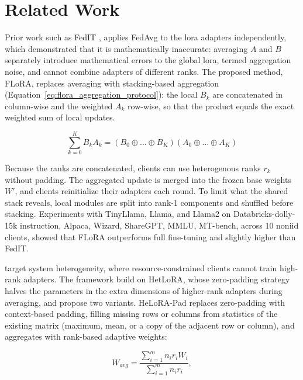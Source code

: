 \documentclass[12pt,a4paper]{article}
\begin{document}
\section{Related Work}

Prior work such as FedIT \cite{zhangBuildingFederatedgptFederated2024}, applies FedAvg to the \gls{lora} adapters independently, which \cite{wangFLoRAFederatedFineTuning} demonstrated that it is mathematically inaccurate: averaging $A$ and $B$ separately introduce mathematical errors to the global \gls{lora}, termed aggregation noise, and cannot combine adapters of different ranks. The proposed method, FLoRA, replaces averaging with stacking-based aggregation (Equation~\eqref{eq:flora_aggregation_protocol}): the local $B_k$ are concatenated in column-wise and the weighted $A_k$ row-wise, so that the product equals the exact weighted sum of local updates.

\begin{equation}
   \sum_{k=0}^{K} B_k A_k = (B_0 \oplus \dots \oplus B_K)(A_0 \oplus \dots \oplus A_K)
  \label{eq:flora_aggregation_protocol}
\end{equation}

Because the ranks are concatenated, clients can use heterogenous ranks $r_k$ without padding. The aggregated update is merged into the frozen base weights $W'$, and clients reinitialize their adapters each round. To limit what the shared stack reveals, local modules are split into rank-1 components and shuffled before stacking. Experiments with TinyLlama, Llama, and Llama2 on Databricks-dolly-15k instruction, Alpaca, Wizard, ShareGPT, MMLU, MT-bench, across 10 \gls{noniid} clients, showed that FLoRA outperforms full fine-tuning and slightly higher than FedIT.

\cite{fanHeLoRALoRAheterogeneousFederated2025} target system heterogeneity, where resource-constrained clients cannot train high-rank adapters. The framework build on HetLoRA, whose zero-padding strategy halves the parameters in the extra dimensions of higher-rank adapters during averaging, and propose two variants. HeLoRA-Pad replaces zero-padding with context-based padding, filling missing rows or columns from statistics of the existing matrix (maximum, mean, or a copy of the adjacent row or column), and aggregates with rank-based adaptive weights:

\begin{equation}
  W_{avg} = \frac{\sum_{i=1}^{m} n_i r_i W_i}{\sum_{i=1}^{m} n_i r_i},
  \label{eq:helora_raa}
\end{equation}
\end{document}
